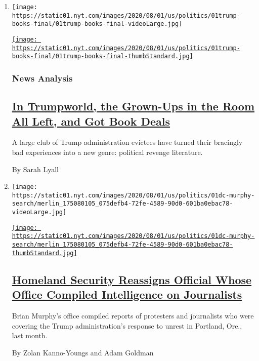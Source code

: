 \begin{enumerate}
\def\labelenumi{\arabic{enumi}.}
\item
  \texttt{[image: https://static01.nyt.com/images/2020/08/01/us/politics/01trump-books-final/01trump-books-final-videoLarge.jpg]}

  \href{/2020/08/01/us/politics/trump-books.html}{\texttt{[image: https://static01.nyt.com/images/2020/08/01/us/politics/01trump-books-final/01trump-books-final-thumbStandard.jpg]}}

  \hypertarget{news-analysis}{%
  \subsubsection{News Analysis}\label{news-analysis}}

  \hypertarget{in-trumpworld-the-grown-ups-in-the-room-all-left-and-got-book-deals}{%
  \subsection{\texorpdfstring{\href{/2020/08/01/us/politics/trump-books.html}{In
  Trumpworld, the Grown-Ups in the Room All Left, and Got Book
  Deals}}{In Trumpworld, the Grown-Ups in the Room All Left, and Got Book Deals}}\label{in-trumpworld-the-grown-ups-in-the-room-all-left-and-got-book-deals}}

  A large club of Trump administration evictees have turned their
  bracingly bad experiences into a new genre: political revenge
  literature.

  By Sarah Lyall
\item
  \texttt{[image: https://static01.nyt.com/images/2020/08/01/us/politics/01dc-murphy-search/merlin\_175080105\_075defb4-72fe-4589-90d0-601ba0ebac78-videoLarge.jpg]}

  \href{/2020/08/01/us/politics/brian-murphy-homeland-security-protesters.html}{\texttt{[image: https://static01.nyt.com/images/2020/08/01/us/politics/01dc-murphy-search/merlin\_175080105\_075defb4-72fe-4589-90d0-601ba0ebac78-thumbStandard.jpg]}}

  \hypertarget{homeland-security-reassigns-official-whose-office-compiled-intelligence-on-journalists}{%
  \subsection{\texorpdfstring{\href{/2020/08/01/us/politics/brian-murphy-homeland-security-protesters.html}{Homeland
  Security Reassigns Official Whose Office Compiled Intelligence on
  Journalists}}{Homeland Security Reassigns Official Whose Office Compiled Intelligence on Journalists}}\label{homeland-security-reassigns-official-whose-office-compiled-intelligence-on-journalists}}

  Brian Murphy's office compiled reports of protesters and journalists
  who were covering the Trump administration's response to unrest in
  Portland, Ore., last month.

  By Zolan Kanno-Youngs and Adam Goldman
\end{enumerate}

